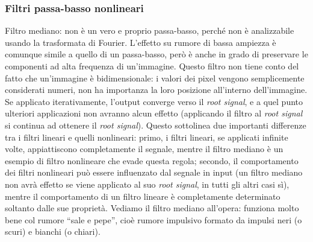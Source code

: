 \documentclass[a4paper,11pt]{article}
\begin{document}
\subsubsection{Filtri passa-basso nonlineari}
Filtro mediano: non è un vero e proprio passa-basso, perché non è analizzabile usando la trasformata di Fourier. L'effetto su rumore di bassa
ampiezza è comunque simile a quello di un passa-basso, però è anche in grado di
preservare le componenti ad alta frequenza di un'immagine. Questo filtro non tiene conto del fatto che un'immagine è bidimensionale: i valori dei pixel
vengono semplicemente considerati numeri, non ha importanza la loro posizione all'interno dell'immagine. Se applicato iterativamente, l'output converge verso
il \textit{root signal}, e a quel punto ulteriori applicazioni non avranno alcun effetto (applicando il filtro al \textit{root signal} si continua
ad ottenere il \textit{root signal}). Questo sottolinea due importanti differenze tra i filtri lineari e quelli nonlineari: primo, i filtri lineari,
se applicati infinite volte, appiattiscono completamente il segnale, mentre il filtro mediano è un esempio di filtro nonlineare che evade questa regola;
secondo, il comportamento dei filtri nonlineari può essere influenzato dal segnale in input (un filtro mediano non avrà effetto se viene applicato al suo
\textit{root signal}, in tutti gli altri casi sì), mentre il comportamento di un filtro lineare è completamente determinato soltanto dalle sue proprietà. Vediamo il
filtro mediano all'opera: funziona molto bene col rumore ``sale e pepe'', cioè rumore impulsivo formato da impulsi neri (o scuri) e bianchi (o chiari).
\end{document}
